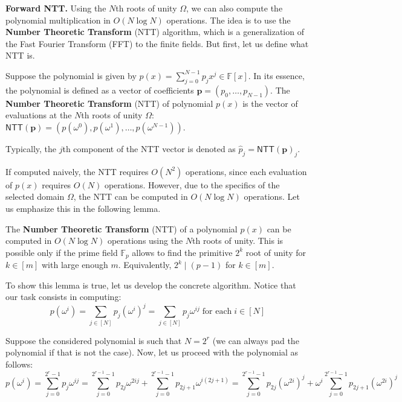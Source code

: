 \documentclass[../lecture-notes.tex]{subfiles}
\begin{document}
\textcolor{blue!60!black}{\textbf{Forward NTT.}} Using the $N$th roots of unity $\Omega$, we can also compute the polynomial
multiplication in $O(N \log N)$ operations. The idea is to use the \textbf{Number
Theoretic Transform} (NTT) algorithm, which is a generalization of the Fast
Fourier Transform (FFT) to the finite fields. But first, let us define 
what NTT is.

\begin{definition}[NTT]
    Suppose the polynomial is given by $p(x) = \sum_{j=0}^{N-1}p_jx^j \in \mathbb{F}[x]$. In its
    essence, the polynomial is defined as a vector of coefficients
    $\boldsymbol{p}=(p_0,\dots,p_{N-1})$. The \textbf{Number Theoretic
    Transform} (NTT) of polynomial $p(x)$ is the vector of evaluations at 
    the $N$th roots of unity $\Omega$:
    $\mathsf{NTT}(\boldsymbol{p}) =
    (p(\omega^0),p(\omega^1),\dots,p(\omega^{N-1}))$.
\end{definition}

\begin{remark}
    Typically, the $j$th component of the NTT vector is denoted as $\hat{p}_j = \mathsf{NTT}(\boldsymbol{p})_j$.
\end{remark}

If computed naively, the NTT requires $O(N^2)$ operations, since each 
evaluation of $p(x)$ requires $O(N)$ operations. However, due to the 
specifics of the selected domain $\Omega$, the NTT can be computed in
$O(N \log N)$ operations. Let us emphasize this in the following lemma.

\begin{lemma}
    The \textbf{Number Theoretic Transform} (NTT) of a polynomial $p(x)$ can be
    computed in $O(N \log N)$ operations using the $N$th roots of unity. This is
    possible only if the prime field $\mathbb{F}_p$ allows to find the primitive
    $2^k$ root of unity for $k \in [m]$ with large enough $m$. Equivalently, 
    $2^k \mid (p-1)$ for $k \in [m]$.
\end{lemma}

To show this lemma is true, let us develop the concrete algorithm. Notice that 
our task consists in computing:
\begin{equation*}
    p(\omega^i) = \sum_{j \in [N]} p_j (\omega^i)^j = \sum_{j \in [N]} p_j \omega^{ij} \; \text{for each} \; i \in [N]
\end{equation*}

Suppose the considered polynomial is such that $N=2^r$ (we can always pad the
polynomial if that is not the case). Now, let us proceed with the polynomial as
follows:
\begin{equation*}
    p(\omega^i) = \sum_{j=0}^{2^{r}-1}p_j\omega^{ij} = \sum_{j=0}^{2^{r-1}-1}p_{2j}\omega^{2ij} + \sum_{j=0}^{2^{r-1}-1}p_{2j+1}\omega^{i(2j+1)} = \sum_{j=0}^{2^{r-1}-1}p_{2j}(\omega^{2i})^j + \omega^i\sum_{j=0}^{2^{r-1}-1}p_{2j+1} (\omega^{2i})^j
\end{equation*}
\end{document}
